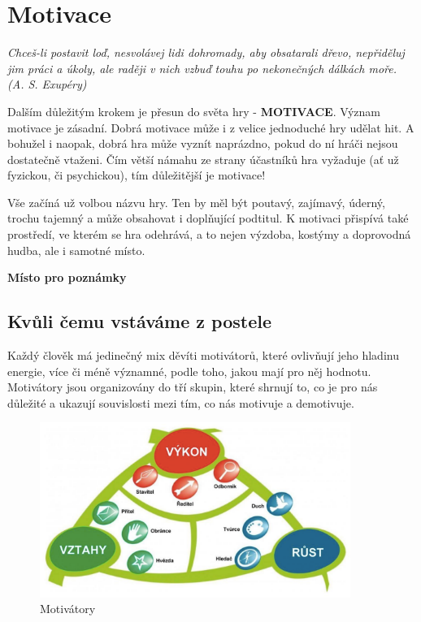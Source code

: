 \documentclass[a4paper,12pt]{report}
\begin{document}
\newpage
\chapter[Motivace]{Motivace}
\textit{Chceš-li postavit loď, nesvolávej lidi dohromady, aby obsatarali dřevo, nepřiděluj jim práci a úkoly, ale raději v nich vzbuď touhu po nekonečných dálkách moře. (A. S. Exupéry)}

Dalším důležitým krokem je přesun do světa hry - \textbf{MOTIVACE}. Význam motivace je zásadní. Dobrá motivace může i z velice jednoduché hry udělat hit. A bohužel i naopak, dobrá hra může vyznít naprázdno, pokud do ní hráči nejsou dostatečně vtaženi. Čím větší námahu ze strany účastníků hra vyžaduje (ať už fyzickou, či psychickou), tím důležitější je motivace!

Vše začíná už volbou názvu hry. Ten by měl být poutavý, zajímavý, úderný, trochu tajemný a může obsahovat i doplňující podtitul. K motivaci přispívá také prostředí, ve kterém se hra odehrává, a to nejen výzdoba, kostýmy a doprovodná hudba, ale i samotné místo.


\begin{samepage}\begin{flushleft}
\end{flushleft}
\textbf{Místo pro poznámky}
\vspace{7cm}
\end{samepage}

\section[Kvůli čemu vstáváme z postele]{Kvůli čemu vstáváme z postele}
Každý člověk má jedinečný mix děvíti motivátorů, které ovlivňují jeho hladinu energie, více či méně významné, podle toho, jakou mají pro něj hodnotu. Motivátory jsou organizovány do tří skupin, které shrnují to, co je pro nás důležité a ukazují souvislosti mezi tím, co nás motivuje a demotivuje.

\newpage

\begin{figure}[hp!]
\begin{center}
\includegraphics[width=0.9\textwidth]{zdroje/motivace1.png}
\caption{Motivátory}
\end{center}
\end{figure}
\end{document}
